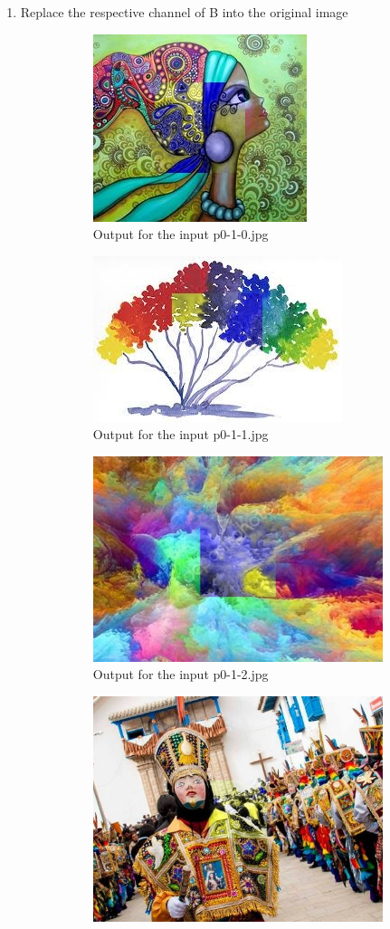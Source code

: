 \begin{enumerate}[label=\emph{\alph*)}]
\item Replace the respective channel of B into the original image
\begin{figure}[h!]
\centering
\begin{subfigure}{0.5\textwidth}
  \centering
  \includegraphics[width=0.5\linewidth]{../output/p0-3-b-0.jpg}
  \caption{Output for the input p0-1-0.jpg}
  \label{fig:sfig1}
\end{subfigure}%
\begin{subfigure}{0.5\textwidth}
  \centering
  \includegraphics[width=0.5\linewidth]{../output/p0-3-b-1.jpg}
  \caption{Output for the input p0-1-1.jpg}
  \label{fig:sfig2}
\end{subfigure}
\begin{subfigure}{0.5\textwidth}
  \centering
  \includegraphics[width=0.5\linewidth]{../output/p0-3-b-2.jpg}
  \caption{Output for the input p0-1-2.jpg}
  \label{fig:sfig1}
\end{subfigure}%
\begin{subfigure}{0.5\textwidth}
  \centering
  \includegraphics[width=0.5\linewidth]{../output/p0-3-b-3.jpg}

\end{subfigure}
\end{figure}
\end{enumerate}
